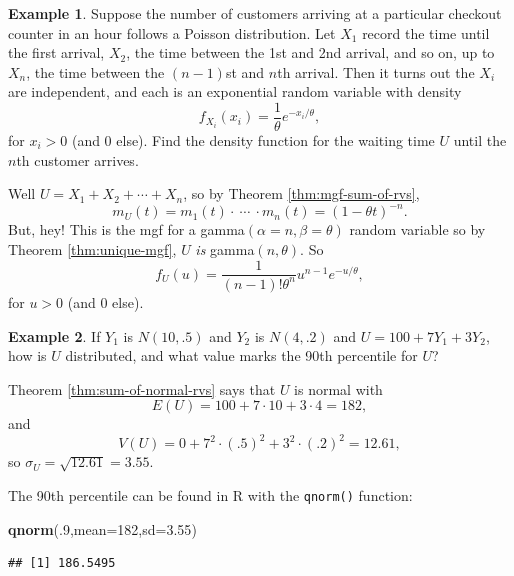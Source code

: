 \documentclass[
]{book}
\newenvironment{Shaded}{\begin{snugshade}}{\end{snugshade}}
\newcommand{\AttributeTok}[1]{\textcolor[rgb]{0.13,0.29,0.53}{#1}}
\newcommand{\DecValTok}[1]{\textcolor[rgb]{0.00,0.00,0.81}{#1}}
\newcommand{\FloatTok}[1]{\textcolor[rgb]{0.00,0.00,0.81}{#1}}
\newcommand{\FunctionTok}[1]{\textcolor[rgb]{0.13,0.29,0.53}{\textbf{#1}}}
\newcommand{\NormalTok}[1]{#1}
\theoremstyle{definition}
\theoremstyle{definition}
\newtheorem{example}{Example}[chapter]
\theoremstyle{definition}
\theoremstyle{definition}
\theoremstyle{remark}
\begin{document}
\begin{example}
Suppose the number of customers arriving at a particular checkout counter in an hour follows a Poisson distribution. Let \(X_1\) record the time until the first arrival, \(X_2\), the time between the 1st and 2nd arrival, and so on, up to \(X_n\), the time between the \((n-1)\)st and \(n\)th arrival. Then it turns out the \(X_i\) are independent, and each is an exponential random variable with density \[f_{X_i}(x_i) = \frac{1}{\theta}e^{-x_i/\theta},\] for \(x_i > 0\) (and 0 else).
Find the density function for the waiting time \(U\) until the \(n\)th customer arrives.

Well \(U = X_1 + X_2 + \cdots + X_n\), so by Theorem \ref{thm:mgf-sum-of-rvs}, \[m_U(t) = m_1(t)\cdot ~\cdots~ \cdot m_n(t) = (1-\theta t)^{-n}.\]
But, hey! This is the mgf for a gamma\((\alpha = n, \beta = \theta)\) random variable so by Theorem \ref{thm:unique-mgf}, \(U\) \emph{is} gamma\((n,\theta)\). So \[f_U(u) = \frac{1}{(n-1)!\theta^n}u^{n-1}e^{-u/\theta},\] for \(u > 0\) (and 0 else).
\end{example}

\begin{example}

If \(Y_1\) is \(N(10,.5)\) and \(Y_2\) is \(N(4,.2)\) and \(U = 100 + 7Y_1 + 3Y_2\), how is \(U\) distributed, and what value marks the 90th percentile for \(U\)?

Theorem \ref{thm:sum-of-normal-rvs} says that \(U\) is normal with \[E(U) = 100 + 7 \cdot 10 + 3 \cdot 4 = 182,\] and \[V(U) = 0 + 7^2\cdot (.5)^2 + 3^2\cdot(.2)^2 = 12.61,\] so \(\sigma_U = \sqrt{12.61} = 3.55.\)

The 90th percentile can be found in R with the \texttt{qnorm()} function:

\begin{Shaded}
\begin{Highlighting}[]
\FunctionTok{qnorm}\NormalTok{(.}\DecValTok{9}\NormalTok{,}\AttributeTok{mean=}\DecValTok{182}\NormalTok{,}\AttributeTok{sd=}\FloatTok{3.55}\NormalTok{)}
\end{Highlighting}
\end{Shaded}

\begin{verbatim}
## [1] 186.5495
\end{verbatim}

\end{example}
\end{document}
